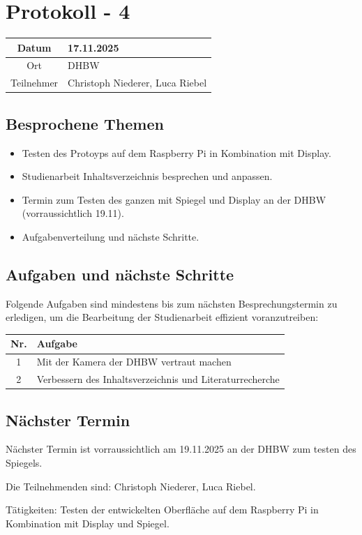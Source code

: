 \chapter{Protokoll - 4}

\begin{table}[H]
    \centering
    \begin{tabular}{|c|l|}
        \hline
        Datum& 17.11.2025 \\
        \hline
        Ort& DHBW\\
        \hline
        Teilnehmer& Christoph Niederer, Luca Riebel\\
        \hline
    \end{tabular}
\end{table}

\section{Besprochene Themen}
\begin{itemize}
    \item Testen des Protoyps auf dem Raspberry Pi in Kombination mit Display.
    \item Studienarbeit Inhaltsverzeichnis besprechen und anpassen.
    \item Termin zum Testen des ganzen mit Spiegel und Display an der DHBW (vorraussichtlich 19.11).
    \item Aufgabenverteilung und nächste Schritte.
\end{itemize}

\section{Aufgaben und nächste Schritte}
Folgende Aufgaben sind mindestens bis zum nächsten Besprechungstermin zu erledigen, um die Bearbeitung der Studienarbeit effizient voranzutreiben:

\begin{table}[H]
    \centering
    \begin{tabular}{|c|p{12cm}|}
        \hline
        \textbf{Nr.} & \textbf{Aufgabe}\\
        \hline
        1 & Mit der Kamera der DHBW vertraut machen\\
        \hline
        2 & Verbessern des Inhaltsverzeichnis und Literaturrecherche\\
        \hline
    \end{tabular}
\end{table}

\newpage

\section{Nächster Termin}
Nächster Termin ist vorraussichtlich am 19.11.2025 an der DHBW zum testen des Spiegels.

Die Teilnehmenden sind: Christoph Niederer, Luca Riebel. 

Tätigkeiten: Testen der entwickelten Oberfläche auf dem Raspberry Pi in Kombination mit Display und Spiegel.